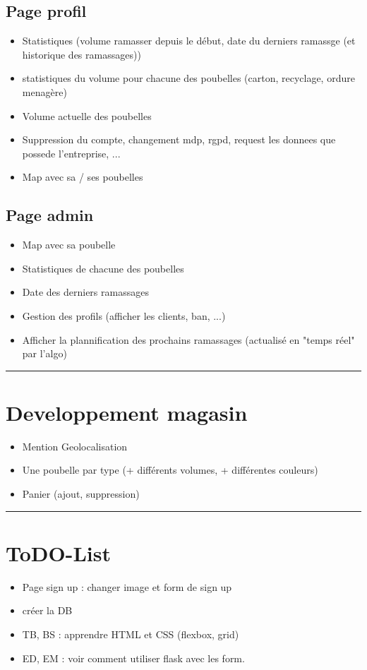\documentclass[10pt,a4paper]{report}
\begin{document}
\subsection{Page profil}
\begin{itemize}
        \item Statistiques (volume ramasser depuis le début, date du derniers ramassge (et historique des ramassages))
        \item statistiques du volume pour chacune des poubelles (carton, recyclage, ordure menagère)
        \item Volume actuelle des poubelles
        \item Suppression du compte, changement mdp, rgpd, request les donnees que possede l'entreprise, ...
        \item Map avec sa / ses poubelles
\end{itemize}

\subsection{Page admin}
\begin{itemize}
        \item Map avec sa poubelle
        \item Statistiques de chacune des poubelles
        \item Date des derniers ramassages
        \item Gestion des profils (afficher les clients, ban, ...)
        \item Afficher la plannification des prochains ramassages (actualisé en "temps réel" par l'algo)
\end{itemize}



\rule{\linewidth}{0.5mm} \bigskip
\section{Developpement magasin}
\begin{itemize}
        \item Mention Geolocalisation 
        \item Une poubelle par type (+ différents volumes, + différentes couleurs) 
        \item Panier (ajout, suppression)
\end{itemize}


\rule{\linewidth}{0.5mm} \bigskip
\section{ToDO-List}
\begin{itemize}
        \item Page sign up : changer image et form de sign up 
        \item créer la DB
        \item TB, BS : apprendre HTML et CSS (flexbox, grid)
        \item ED, EM : voir comment utiliser flask avec les form.
\end{itemize}
\end{document}
